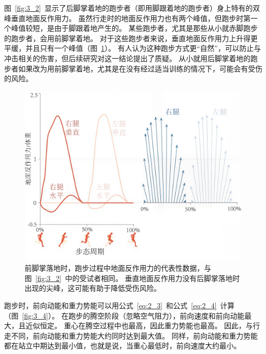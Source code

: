 图~\ref{fig:3_2}~显示了后脚掌着地的跑步者（即用脚跟着地的跑步者）身上特有的双峰垂直地面反作用力。
虽然行走时的地面反作用力也有两个峰值，但跑步时第一个峰值较短，是由于脚跟着地产生的。
某些跑步者，尤其是那些从小就赤脚跑步的跑步者，会用前脚掌着地。
对于这些跑步者来说，垂直地面反作用力上升得更平缓，并且只有一个峰值（图~\ref{fig:3_3}）。
有人认为这种跑步方式更“自然”，可以防止与冲击相关的伤害，但后续研究对这一结论提出了质疑。
从小就用后脚掌着地的跑步者如果改为用前脚掌着地，尤其是在没有经过适当训练的情况下，可能会有受伤的风险。

\begin{figure}[!htb]
	\centering
	\includegraphics[width=0.9\linewidth]{chap3/3_3}
	\caption{前脚掌落地时，跑步过程中地面反作用力的代表性数据，与图~\ref{fig:3_2}~中的受试者相同。
		垂直地面反作用力没有后脚掌落地时出现的尖峰，这可能有助于降低受伤风险\cite{yong2020foot}。 \label{fig:3_3}}
\end{figure}


跑步时，前向动能和重力势能可以用公式~\ref{eq:2_3}~和公式~\ref{eq:2_4}~计算（图~\ref{fig:3_4}）。
在跑步的腾空阶段（忽略空气阻力），前向速度和前向动能最大，且近似恒定。
重心在腾空过程中也最高，因此重力势能也最高。
因此，与行走不同，前向动能和重力势能大约同时达到最大值。
同样，前向动能和重力势能都在站立中期达到最小值，也就是说，当重心最低时，前向速度大约最小。

